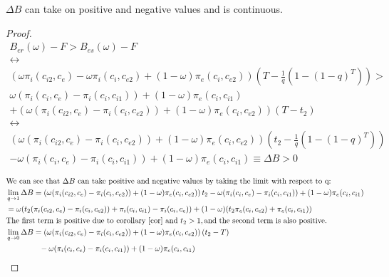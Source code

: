 \begin{proposition}
$\Delta B$ can take on positive and negative values and is continuous. 
\end{proposition}
\begin{proof}
\begin{align*}
B_{er}(\omega)-F > B_{es}(\omega)-F \\
\leftrightarrow \\
\left(\omega\pi_{i}(c_{i2},c_{e})-\omega \pi_{i}(c_{i},c_{e2})+(1-\omega)\pi_{e}(c_{i},c_{e2}) \right) \left( T - \frac{1}{q} \left( 1-(1-q)^{T} \right) \right)> \\ 
\omega(\pi_i(c_i,c_{e})-\pi_i(c_i,c_{i1}))+(1-\omega)\pi_e(c_i,c_{i1}) \\
+(\omega(\pi_i(c_{i2},c_e)- \pi_i(c_{i},c_{e2}))+(1-\omega)\pi_e(c_{i},c_{e2}))(T-t_2) \\
\leftrightarrow \\
\left(\omega (\pi_{i}(c_{i2},c_{e})- \pi_{i}(c_{i},c_{e2}))+(1-\omega)\pi_{e}(c_{i},c_{e2}) \right) \left( t_2- \frac{1}{q} \left( 1-(1-q)^T \right) \right)  \\
-\omega(\pi_i(c_i,c_{e})-\pi_i(c_i,c_{i1}))+(1-\omega)\pi_e(c_i,c_{i1}) \equiv \Delta B >0 \\
\end{align*}
\begin{align*}
&\text{We can see that } \Delta B \text{ can take positive and negative values by taking the limit with respect to q:} \\
&\lim_{q \to 1}\Delta B = \left(\omega (\pi_{i}(c_{i2},c_{e})- \pi_{i}(c_{i},c_{e2}))+(1-\omega)\pi_{e}(c_{i},c_{e2}) \right) t_2
-\omega(\pi_i(c_i,c_{e})-\pi_i(c_i,c_{i1}))+(1-\omega)\pi_e(c_i,c_{i1})
\\
& = \omega (t_2 (\pi_{i}(c_{i2},c_{e})- \pi_{i}(c_{i},c_{e2})) + \pi_i(c_i,c_{i1}) -\pi_i(c_i,c_{e}) ) 
+ (1-\omega)(t_2 \pi_{e}(c_{i},c_{e2}) + \pi_e(c_i,c_{i1}))
\\
& \text{The first term is positive due to corollary \ref{cor} and } t_2>1, \text{and the second term is also positive. } \\
&\lim_{q \to 0}\Delta B = \left(\omega (\pi_{i}(c_{i2},c_{e})- \pi_{i}(c_{i},c_{e2}))+(1-\omega)\pi_{e}(c_{i},c_{e2}) \right) (t_2-T)
\\
& ~~~~~~~~~~~~~  -\omega(\pi_i(c_i,c_{e})-\pi_i(c_i,c_{i1}))+(1-\omega)\pi_e(c_i,c_{i1})

\end{align*}
\end{proof}
